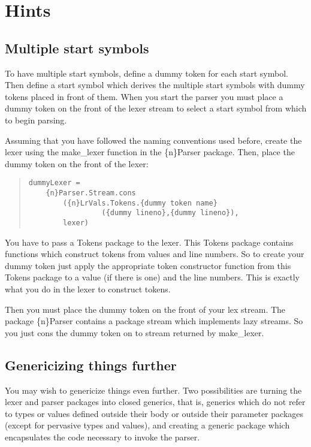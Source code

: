 \section{Hints}
\subsection{Multiple start symbols}
To have multiple start symbols, define a dummy token for each
start symbol.  Then define a start symbol which derives the
multiple start symbols with dummy tokens placed in front of
them.  When you start the parser you must place a dummy token
on the front of the lexer stream to select a start symbol
from which to begin parsing.

Assuming that you have followed the naming conventions used before,
create the lexer using the make_lexer function in the \{n\}Parser package.
Then, place the dummy token on the front of the lexer:
\begin{quote}
\begin{verbatim}
dummyLexer =
    {n}Parser.Stream.cons
        ({n}LrVals.Tokens.{dummy token name}
                 ({dummy lineno},{dummy lineno}),
        lexer)
\end{verbatim}
\end{quote}
You have to pass a Tokens package to the lexer.  This Tokens package
contains functions which construct tokens from values and line numbers.
So to create your dummy token just apply the appropriate token constructor
function from this Tokens package to a value (if there is one) and the
line numbers.   This is exactly what you do in the lexer to construct tokens.

Then you must place the dummy token on the front of your lex stream.
The package \{n\}Parser contains a package stream which implements
lazy streams.  So you just cons the dummy token on to stream returned
by make_lexer.
\subsection{Genericizing things further}

You may wish to genericize things even further.  Two possibilities
are turning the lexer and parser packages into closed generics,
that is, generics which do not refer to types or values defined
outside their body or outside their parameter packages (except
for pervasive types and values), and creating a generic package which
encapsulates the code necessary to invoke the parser.


